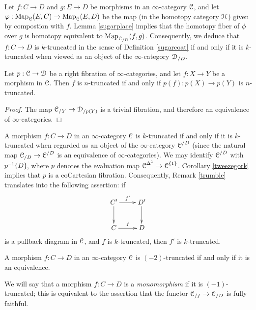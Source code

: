 \begin{remark}
Let $f: C \rightarrow D$ and $g: E \rightarrow D$ be morphisms in an $\infty$-category $\operatorname{\mathcal{C}}$,
and let $\varphi: \operatorname{{Map}}_{\operatorname{\mathcal{C}}}(E,C) \rightarrow \operatorname{{Map}}_{\operatorname{\mathcal{C}}}(E,D)$ be the map (in the homotopy category $\operatorname{\mathcal{H}}$) given by compostion with $f$. Lemma \ref{sugarplace} implies that the homotopy fiber of $\phi$ over $g$ is homotopy equivalent to 
$\operatorname{{Map}}_{\operatorname{\mathcal{C}}_{/D}}(f,g)$. Consequently, we deduce that $f: C \rightarrow D$ is $k$-truncated in the sense of Definition \ref{sugarcoat} if and only if it is $k$-truncated when viewed as an object of the $\infty$-category $\operatorname{\mathcal{D}}_{/D}$.
\end{remark}

\begin{lemma}\label{truncslice}
Let $p: \operatorname{\mathcal{C}} \rightarrow \operatorname{\mathcal{D}}$ be a right fibration of $\infty$-categories, and let
$f: X \rightarrow Y$ be a morphism in $\operatorname{\mathcal{C}}$. Then $f$ is $n$-truncated if and only if
$p(f): p(X) \rightarrow p(Y)$ is $n$-truncated.
\end{lemma}

\begin{proof}
The map $\operatorname{\mathcal{C}}_{/Y} \rightarrow \operatorname{\mathcal{D}}_{/p(Y)}$ is
a trivial fibration, and therefore an equivalence of $\infty$-categories.
\end{proof}

\begin{remark}\label{tunc}
A morphism $f: C \rightarrow D$ in an $\infty$-category $\operatorname{\mathcal{C}}$ is  $k$-truncated if and only if it is $k$-truncated when regarded as an object of the $\infty$-category $\operatorname{\mathcal{C}}^{/D}$ (since the natural
map $\operatorname{\mathcal{C}}_{/D} \rightarrow \operatorname{\mathcal{C}}^{/D}$ is an equivalence of $\infty$-categories). We may identify $\operatorname{\mathcal{C}}^{/D}$ with $p^{-1} \{D \}$, where $p$ denotes the evaluation map
$\operatorname{\mathcal{C}}^{\Delta^1} \rightarrow \operatorname{\mathcal{C}}^{\{1\}}$. Corollary \ref{tweezegork} implies that $p$ is a coCartesian fibration. Consequently, Remark \ref{trumble} translates into the following assertion: if
$$ \xymatrix{ C' \ar[r]^{f'} \ar[d] & D' \ar[d] \\
C \ar[r]^{f} & D }$$
is a pullback diagram in $\operatorname{\mathcal{C}}$, and $f$ is $k$-truncated, then $f'$ is $k$-truncated.
\end{remark}

\begin{example}
A morphism $f: C \rightarrow D$ in an $\infty$-category $\operatorname{\mathcal{C}}$ is $(-2)$-truncated if and only if it is an equivalence.
\end{example}

We will say that a morphism $f: C \rightarrow D$ is a {\it monomorphism} if it is $(-1)$-truncated; this is equivalent to the assertion that the functor $\operatorname{\mathcal{C}}_{/f} \rightarrow \operatorname{\mathcal{C}}_{/D}$ is fully faithful.

